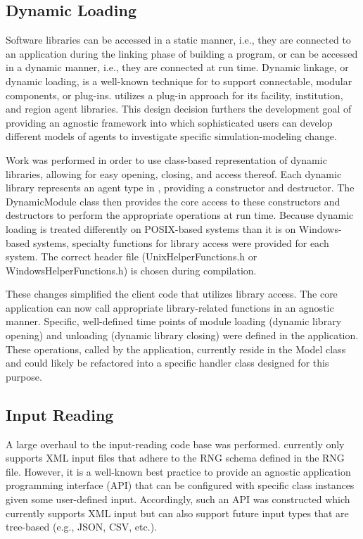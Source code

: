 \subsection{Dynamic Loading}\label{sec:prev-dynamic}

Software libraries can be accessed in a static manner, i.e., they are connected
to an application during the linking phase of building a program, or can be
accessed in a dynamic manner, i.e., they are connected at run time. Dynamic
linkage, or dynamic loading, is a well-known technique for to support
connectable, modular components, or plug-ins. \Cyclus utilizes a plug-in
approach for its facility, institution, and region agent libraries. This design
decision furthers the \Cyclus development goal of providing an agnostic
framework into which sophisticated users can develop different models of agents
to investigate specific simulation-modeling change.

Work was performed in order to use class-based representation of dynamic
libraries, allowing for easy opening, closing, and access thereof. Each dynamic
library represents an agent type in \Cyclus, providing a constructor and
destructor. The DynamicModule class then provides the \Cyclus core access to
these constructors and destructors to perform the appropriate operations at run
time. Because dynamic loading is treated differently on POSIX-based systems than
it is on Windows-based systems, specialty functions for library access were
provided for each system. The correct header file (UnixHelperFunctions.h or
WindowsHelperFunctions.h) is chosen during compilation. 

These changes simplified the client code that utilizes library access. The
\Cyclus core application can now call appropriate library-related functions in
an agnostic manner. Specific, well-defined time points of module loading
(dynamic library opening) and unloading (dynamic library closing) were defined
in the \Cyclus application. These operations, called by the application,
currently reside in the Model class and could likely be refactored into a
specific handler class designed for this purpose.

\subsection{Input Reading}

A large overhaul to the input-reading code base was performed. \Cyclus currently
only supports XML input files that adhere to the RNG schema defined in the
\Cyclus RNG file. However, it is a well-known best practice to provide an
agnostic application programming interface (API) that can be configured with
specific class instances given some user-defined input. Accordingly, such an API
was constructed which currently supports XML input but can also support future
input types that are tree-based (e.g., JSON, CSV, etc.).

